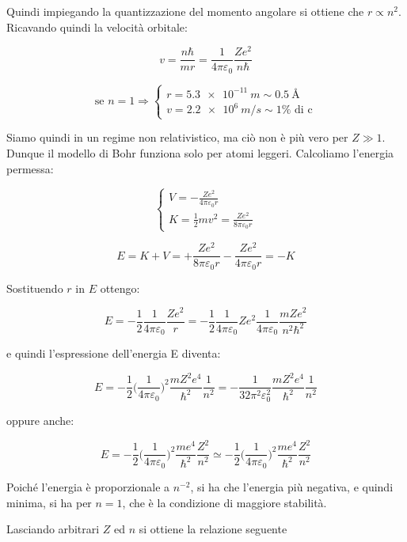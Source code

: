 Quindi impiegando la quantizzazione del momento angolare si ottiene che $r \propto n^2$.
Ricavando quindi la velocità orbitale:

$$ v = \frac{n \hbar}{m r} = \frac{1}{4\pi\varepsilon_0} \frac{Z e^2}{n \hbar} $$

\begin{equation}
\mbox{se }n = 1
\Rightarrow
\begin{cases}
	r = \SI{5.3e-11}{m} \sim \SI{0.5}{\angstrom} \\
	v = \SI{2.2e6}{m/s} \sim 1\% \mbox{ di c}
\end{cases}
\end{equation}

Siamo quindi in un regime non relativistico, ma ciò non è più vero per $Z \gg 1$.
Dunque il modello di Bohr funziona solo per atomi leggeri.
Calcoliamo l'energia permessa:

\begin{equation}
\begin{cases}
	V = - \frac{Z e^2}{4 \pi \varepsilon_0 r} \\
	K = \frac{1}{2} m v^2 = \frac{Z e^2}{8 \pi \varepsilon_0 r} 
\end{cases}
\end{equation}

$$ E = K + V = + \frac{Z e^2}{8 \pi \varepsilon_0 r} - \frac{Z e^2}{4 \pi \varepsilon_0 r} = - K $$

Sostituendo $r$ in $E$ ottengo:

$$ E = - \frac{1}{2} \frac{1}{4\pi\varepsilon_0} \frac{Z e^2}{r} = - \frac{1}{2} \frac{1}{4\pi\varepsilon_0} Z e^2 \frac{1}{4\pi\varepsilon_0} \frac{m Z e^2}{n^2 \hbar^2}$$

e quindi l'espressione dell'energia E diventa:

$$ E = - \frac{1}{2} \biggl(\frac{1}{4\pi\varepsilon_0}\biggr)^2 \frac{m Z^2 e^4}{\hbar^2} \frac{1}{n^2} = - \frac{1}{32\pi^2\varepsilon_0^2} \frac{m Z^2 e^4}{\hbar^2} \frac{1}{n^2} $$

oppure anche:

$$ E =   - \frac{1}{2} \biggl(\frac{1}{4\pi\varepsilon_0}\biggr)^2 \frac{m e^4}{\hbar^2} \frac{Z^2}{n^2} \simeq - \frac{1}{2} \biggl(\frac{1}{4\pi\varepsilon_0}\biggr)^2 \frac{m e^4}{\hbar^2} \frac{Z^2}{n^2} $$

Poiché l'energia è proporzionale a $n^{-2}$, si ha che l'energia più negativa, e quindi minima, si ha per $n = 1$, che è la condizione di maggiore stabilità.

Lasciando arbitrari $Z$ ed $n$ si ottiene la relazione seguente

